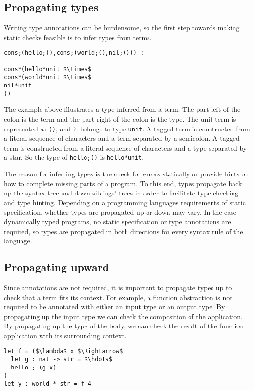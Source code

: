 \documentclass[sigplan,screen]{acmart}
\begin{document}
\subsection{Propagating types}
Writing type annotations can be burdensome, so the first step 
towards making static checks feasible is to infer types from terms.

\begin{lstlisting}
cons;(hello;(),cons;(world;(),nil;())) : 

cons*(hello*unit $\times$ 
cons*(world*unit $\times$ 
nil*unit
))
\end{lstlisting}

\noindent The example above illustrates a type inferred from a term.
The part left of the colon is the term and the part right of the colon is the type.
The unit term is represented as \lstinline{()}, and it belongs to type \lstinline{unit}. 
A tagged term is constructed from a literal sequence of characters and a term separated
by a semicolon. A tagged term is constructed from a literal sequence of characters
and a type separated by a star.
So the type of \lstinline{hello;()} is \lstinline{hello*unit}.

The reason for inferring types is the check for errors statically or 
provide hints on how to complete missing parts of a program. To this end,
types propagate back up the syntax tree and down siblings' trees in order
to facilitate type checking and type hinting.
Depending on a programming languages requirements of static specification, 
whether types are propagated up or down may vary. 
In the case dynamically typed programs, no static specification or type annotations
are required, so types are propagated in both directions for every syntax rule
of the language.


\subsection{Propagating upward}
Since annotations are not required, it is important to propagate types up to check
that a term fits its context.
For example, a function abstraction is not required to be annotated 
with either an input type or an output type. 
\noindent By propagating up the input type we can check the composition of the application.
By propagating up the type of the body, we can check the result of the function application 
with its surrounding context. 

\begin{lstlisting}
let f = ($\lambda$ x $\Rightarrow$ 
  let g : nat -> str = $\hdots$
  hello ; (g x)
) 
let y : world * str = f 4
\end{lstlisting}
\end{document}
